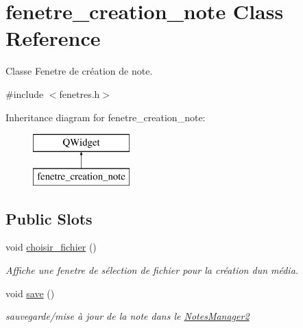 \hypertarget{classfenetre__creation__note}{}\section{fenetre\+\_\+creation\+\_\+note Class Reference}
\label{classfenetre__creation__note}


Classe Fenetre de création de note.  




{\ttfamily \#include $<$fenetres.\+h$>$}

Inheritance diagram for fenetre\+\_\+creation\+\_\+note\+:\begin{figure}[H]
\begin{center}
\leavevmode
\includegraphics[height=2.000000cm]{classfenetre__creation__note}
\end{center}
\end{figure}
\subsection*{Public Slots}
\begin{DoxyCompactItemize}
\item 
\mbox{\label{classfenetre__creation__note_aca59451560c2499954b64ed21db04eb2}} 
void \hyperlink{classfenetre__creation__note_aca59451560c2499954b64ed21db04eb2}{choisir\+\_\+fichier} ()
\begin{DoxyCompactList}\small\item\em Affiche une fenetre de sélection de fichier pour la création d\textquotesingle{}un média. \end{DoxyCompactList}\item 
\mbox{\label{classfenetre__creation__note_a148abe3a7d3ba11210f456d4cddce196}} 
void \hyperlink{classfenetre__creation__note_a148abe3a7d3ba11210f456d4cddce196}{save} ()
\begin{DoxyCompactList}\small\item\em sauvegarde/mise à jour de la note dans le \hyperlink{class_notes_manager2}{Notes\+Manager2} \end{DoxyCompactList}\end{DoxyCompactItemize}
